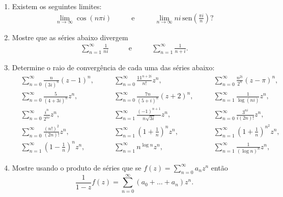 \begin{enumerate}[leftmargin=*]
 	\item Existem os seguintes limites: 
 			$$
			\begin{array}{lll}
				\displaystyle \lim_{n\to\infty} \cos(n\pi i)
				&\qquad\text{e}
				&\qquad\displaystyle \lim_{n\to\infty} ni\,\text{sen}\left(\frac{\pi i}{n}\right) ?	
			\end{array}	
			$$

	\item Mostre que as séries abaixo divergem
			$$
			\begin{array}{lll}
				\displaystyle \sum_{n=1}^{\infty}\frac{1}{ni}
				&\qquad\text{e}
				&\qquad\displaystyle \sum_{n=1}^{\infty}\frac{1}{n+i}.
			\end{array}	
			$$

	\item Determine o raio de convergência de cada uma das séries abaixo:
	 \begin{equation*}
		\begin{array}{llll}
			&\displaystyle\sum_{n=0}^{\infty}\frac{n}{(3i)^n}(z-1)^n,
			&\qquad \displaystyle \sum_{n=0}^{\infty}\frac{11^{n+2i}}{n!} z^n,
			&\qquad \displaystyle \sum_{n=0}^{\infty}\frac{n^{2i}}{2^n} (z-\pi)^n,
			\\[1.0cm]
			&\displaystyle\sum_{n=0}^{\infty} \frac{5}{(4+3i)^n} z^n,
			&\qquad \displaystyle \sum_{n=0}^{\infty} \frac{7n}{(5+i)^n} (z+2)^n,
			&\qquad \displaystyle \sum_{n=1}^{\infty} \frac{1}{\log (ni)} z^n,
			\\[1.0cm]
			&\displaystyle\sum_{n=0}^{\infty}\frac{i^n}{2^{ni}}z^n,
			&\qquad \displaystyle \sum_{n=1}^{\infty} \frac{(-1)^{n+1}}{n\sqrt{3i}} z^n,
			&\qquad \displaystyle \sum_{n=0}^{\infty} \frac{3^{ni}}{i(2n)!} z^n,
			\\[1.0cm]
			&\displaystyle\sum_{n=0}^{\infty}\frac{(n!)^2}{(2n)!}z^n,
			&\qquad \displaystyle \sum_{n=1}^{\infty} \left(1+\frac{1}{n}\right)^n z^n,
			&\qquad \displaystyle \sum_{n=1}^{\infty} \left(1+\frac{1}{n}\right)^{n^2} z^n,
			\\[1.0cm]
			&\displaystyle\sum_{n=1}^{\infty} \left(1-\frac{1}{n}\right)^n z^n,
			&\qquad \displaystyle \sum_{n=1}^{\infty} n^{\log n} z^n,
			&\qquad \displaystyle \sum_{n=1}^{\infty} \frac{1}{(\log n)^n} z^n,
		\end{array}
	 \end{equation*}	

	\item Mostre usando o produto de séries que se $f(z)=\displaystyle\sum_{n=0}^{\infty}a_n z^n$
	então
	$$
	\frac{1}{1-z}f(z) = \sum_{n=0}^{\infty}(a_0+\ldots+a_n)z^n.
	$$
	

\end{enumerate}

